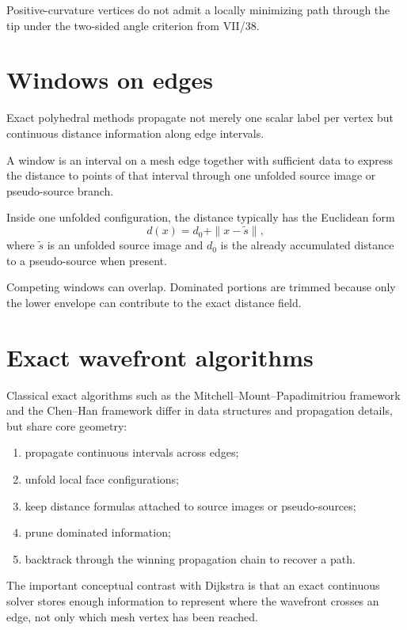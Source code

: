 Positive-curvature vertices do not admit a locally minimizing path through the
tip under the two-sided angle criterion from VII/38.

\section{Windows on edges}

Exact polyhedral methods propagate not merely one scalar label per vertex but
continuous distance information along edge intervals.

\begin{definition}[Window]\label{def:vii39-window}
A window is an interval on a mesh edge together with sufficient data to express
the distance to points of that interval through one unfolded source image or
pseudo-source branch.
\end{definition}

Inside one unfolded configuration, the distance typically has the Euclidean form
\[
d(x)=d_0+\|x-\widetilde s\|,
\]
where \(\widetilde s\) is an unfolded source image and \(d_0\) is the already
accumulated distance to a pseudo-source when present.

Competing windows can overlap.  Dominated portions are trimmed because only the
lower envelope can contribute to the exact distance field.

\section{Exact wavefront algorithms}

Classical exact algorithms such as the Mitchell--Mount--Papadimitriou framework
and the Chen--Han framework differ in data structures and propagation details,
but share core geometry:
\begin{enumerate}[label=(\roman*)]
\item propagate continuous intervals across edges;
\item unfold local face configurations;
\item keep distance formulas attached to source images or pseudo-sources;
\item prune dominated information;
\item backtrack through the winning propagation chain to recover a path.
\end{enumerate}

The important conceptual contrast with Dijkstra is that an exact continuous
solver stores enough information to represent where the wavefront crosses an
edge, not only which mesh vertex has been reached.

